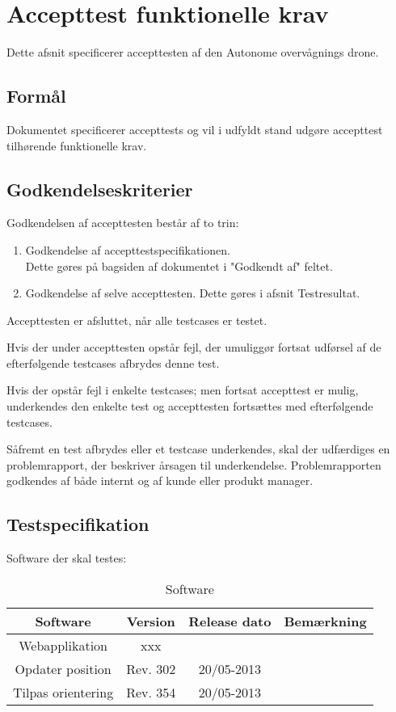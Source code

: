 \section{Accepttest funktionelle krav}
Dette afsnit specificerer accepttesten af den Autonome overvågnings drone.

\subsection*{Formål}
Dokumentet specificerer accepttests og vil i udfyldt stand udgøre accepttest tilhørende funktionelle krav. 

\subsection*{Godkendelseskriterier}
Godkendelsen af accepttesten består af to trin:

\begin{enumerate}
	\item Godkendelse af accepttestspecifikationen. \\
	Dette gøres på bagsiden af dokumentet i "Godkendt af" feltet.

	\item Godkendelse af selve accepttesten. Dette gøres i afsnit Testresultat. 
\end{enumerate}

Accepttesten er afsluttet, når alle testcases er testet.

Hvis der under accepttesten opstår fejl, der umuliggør fortsat udførsel af de efterfølgende testcases afbrydes denne test.

Hvis der opstår fejl i enkelte testcases; men fortsat accepttest er mulig, underkendes den enkelte test og accepttesten fortsættes med efterfølgende testcases.

Såfremt en test afbrydes eller et testcase underkendes, skal der udfærdiges en problemrapport, der beskriver årsagen til underkendelse. Problemrapporten godkendes af både internt og af kunde eller produkt manager.

\newpage

\subsection*{Testspecifikation}
Software der skal testes:
\begin{table}[H]
	\centering
		\begin{tabular}{|c|c|c|c|}
			\hline
			Software & Version & Release dato & Bemærkning \\ \hline
			Webapplikation & xxx & &\\ \hline
			Opdater position & Rev. 302 & 20/05-2013 & \\ \hline
			Tilpas orientering & Rev. 354 & 20/05-2013 & \\ \hline
		\end{tabular}
	\caption{Software}
\end{table}

